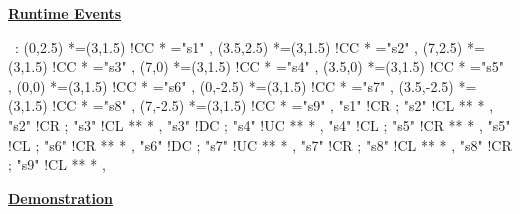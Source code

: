 \documentclass[a4,12pt]{seminar}
\newcommand{\SlideTitle}[1]{\Large \underline{\textbf{#1}}\normalsize}
\begin{document}
\begin{slide}{\SlideTitle{Runtime Events}}

\ \xy<1cm,0cm>:
(0,2.5)    *=(3,1.5) !CC   *\frm{-} ="s1" ,
(3.5,2.5)  *=(3,1.5) !CC   *\frm{-} ="s2" ,
(7,2.5)    *=(3,1.5) !CC   *\frm{-} ="s3" ,
(7,0)      *=(3,1.5) !CC   *\frm{-} ="s4" ,
(3.5,0)    *=(3,1.5) !CC   *\frm{-} ="s5" ,
(0,0)      *=(3,1.5) !CC   *\frm{--} ="s6" ,
(0,-2.5)   *=(3,1.5) !CC   *\frm{--} ="s7" ,
(3.5,-2.5) *=(3,1.5) !CC   *\frm{--} ="s8" ,
(7,-2.5)   *=(3,1.5) !CC   *\frm{-} ="s9" ,
%
"s1" !CR ; "s2" !CL **\dir{-} *\dir{>} ,
"s2" !CR ; "s3" !CL **\dir{-} *\dir{>} ,
"s3" !DC ; "s4" !UC **\dir{-} *\dir{>} ,
"s4" !CL ; "s5" !CR **\dir{-} *\dir{>} ,
"s5" !CL ; "s6" !CR **\dir{-} *\dir{>} ,
"s6" !DC ; "s7" !UC **\dir{--} *\dir{>} ,
"s7" !CR ; "s8" !CL **\dir{--} *\dir{>} ,
"s8" !CR ; "s9" !CL **\dir{-} *\dir{>} ,
\endxy

\vfill

\end{slide}


\begin{slide}{\SlideTitle{Demonstration}}

\vspace{25mm}

\begin{center}
\end{center}

\vfill

\end{slide}
\end{document}
